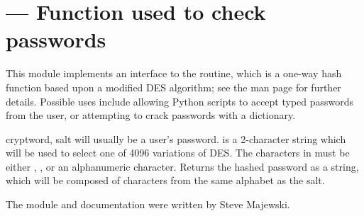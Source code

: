 \section{ ---
         Function used to check \UNIX{} passwords}



This module implements an interface to the  routine,
which is a one-way hash function based upon a modified DES algorithm;
see the \UNIX{} man page for further details.  Possible uses include
allowing Python scripts to accept typed passwords from the user, or
attempting to crack \UNIX{} passwords with a dictionary.

\begin{funcdesc}{crypt}{word, salt} 
 will usually be a user's password.   is a
2-character string which will be used to select one of 4096 variations
of DES.  The characters in  must be
either , \character{/}, or an alphanumeric character.
Returns the hashed password as a string, which will be composed of
characters from the same alphabet as the salt.
\end{funcdesc}

The module and documentation were written by Steve Majewski.
